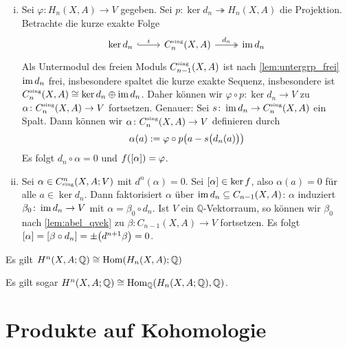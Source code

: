\begin{beweis}[name={von \autoref{eig_kohomo_to_hom_homo}}] \leavevmode
	\begin{enumerate}[(i)]
		\item Sei $\varphi \colon H_n(X,A) \to V$ gegeben. Sei $p \colon\ker d_n \twoheadrightarrow H_n(X,A)$ die Projektion. Betrachte die kurze exakte Folge 
	\[
		\begin{tikzcd}
			\ker  d_n \rar[hook,"i"] & C_n^\sing(X,A) \rar["d_n",two heads] & \im d_n
		\end{tikzcd}
	\]
	Als Untermodul des freien Moduls $C_{n-1}^\sing(X,A)$ ist nach \autoref{lem:untergrp_frei} $\im d_n$ frei, insbesondere spaltet die kurze exakte Sequenz, insbesondere ist
	$C^\sing_n(X,A) \cong \ker d_n \oplus \im d_n$. Daher können wir $\varphi \circ p \colon \ker d_n \to V$ zu $\alpha \colon C_n^\sing(X,A) \to V$ fortsetzen. Genauer: Sei 
	$s \colon \im d_n \to C_n^\sing(X,A)$ ein Spalt. Dann können wir $\alpha \colon C_n^\sing(X,A) \to V$ definieren durch 
	\[
		\alpha(a) := \varphi \circ p \enbrace*{a - s \enbrace[\big]{d_n(a)}}
	\]
	Es folgt $d_n \circ \alpha =0$ und $f \enbrace*{[\alpha]}=\varphi$.
	\item Sei $\alpha \in C^n_\sing(X,A;V)$ mit $d^n(\alpha)=0$. Sei $\benbrace*{\alpha} \in \ker f$, also $\alpha(a)=0$ für alle $a \in \ker d_n$.  Dann faktorisiert $\alpha$ über
	$\im d_n \subseteq C_{n-1}(X,A)$: $\alpha$ induziert $\beta_0 \colon \im d_n \to V$ mit $\alpha = \beta_0 \circ d_n$. Ist $V$ ein $\mathbb{Q}$-Vektorraum, so können wir 
	$\beta_0$ nach \autoref{lem:abel_qvek} zu $\beta \colon C_{n-1}(X,A) \to V$ fortsetzen. Es folgt 
	$\benbrace*{\alpha}= \benbrace*{\beta \circ d_n} = \pm \enbrace*{d^{n+1} \beta}=0$. \qedhere
	\end{enumerate}
\end{beweis}

\begin{korollarB}
	Es gilt $H^n(X,A;\mathbb{Q}) \cong \Hom \enbrace*{H_n(X,A);\mathbb{Q}}$
\end{korollarB}

\begin{bemerkung}
	Es gilt sogar $H^n \enbrace*{X,A;\mathbb{Q}} \cong \Hom_\mathbb{Q} \enbrace*{H_n(X,A;\mathbb{Q}),\mathbb{Q}}$.
\end{bemerkung}
\newpage

\section{Produkte auf Kohomologie} %
\label{sec:3}

